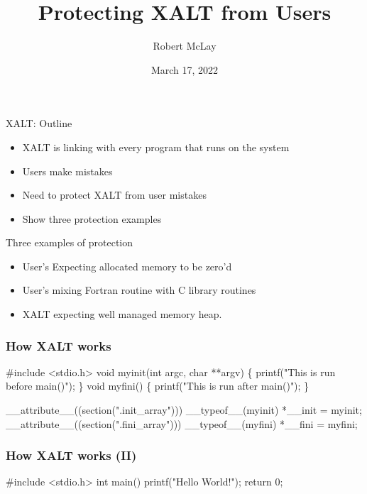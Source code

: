 \documentclass{beamer}
\begin{document}
\title[XALT]{Protecting XALT from Users}
\author{Robert McLay}
\date{March 17, 2022}

\frame{\titlepage}

\begin{frame}{XALT: Outline}
  \begin{itemize}
    \item XALT is linking with every program that runs on the system
    \item Users make mistakes
    \item Need to protect XALT from user mistakes
    \item Show three protection examples 
  \end{itemize}
\end{frame}

\begin{frame}{Three examples of protection}
  \begin{itemize}
    \item User's Expecting allocated memory to be zero'd
    \item User's mixing Fortran routine with C library routines
    \item XALT expecting well managed memory heap.
  \end{itemize}
\end{frame}


\begin{frame}[fragile]
    \frametitle{How XALT works}
 {\tiny
    \begin{semiverbatim}
#include <stdio.h>
void myinit(int argc, char **argv)
\{ printf("This is run before main()\n"); \}
void myfini()
\{ printf("This is run after main()\n"); \}

__attribute__((section(".init_array"))) __typeof__(myinit) *__init = myinit;
__attribute__((section(".fini_array"))) __typeof__(myfini) *__fini = myfini;
    \end{semiverbatim}
}
\end{frame}

\begin{frame}[fragile]
    \frametitle{How XALT works (II)}
 {\tiny
    \begin{semiverbatim}
#include <stdio.h>
int main()
{
  printf("Hello World!\n");
  return 0;
}

    \end{semiverbatim}
}
\end{frame}
\end{document}
